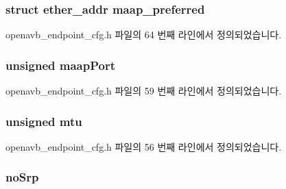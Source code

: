 \subsubsection[{\texorpdfstring{maap\+\_\+preferred}{maap_preferred}}]{\setlength{\rightskip}{0pt plus 5cm}struct ether\+\_\+addr maap\+\_\+preferred}\hypertarget{structopenavb__endpoint__cfg__t_aa373a13c1441edd60e02fe528e88b2e7}{}\label{structopenavb__endpoint__cfg__t_aa373a13c1441edd60e02fe528e88b2e7}


openavb\+\_\+endpoint\+\_\+cfg.\+h 파일의 64 번째 라인에서 정의되었습니다.

\subsubsection[{\texorpdfstring{maap\+Port}{maapPort}}]{\setlength{\rightskip}{0pt plus 5cm}unsigned maap\+Port}\hypertarget{structopenavb__endpoint__cfg__t_a5c3c54c1842b2ea86da2fb15728b5ab0}{}\label{structopenavb__endpoint__cfg__t_a5c3c54c1842b2ea86da2fb15728b5ab0}


openavb\+\_\+endpoint\+\_\+cfg.\+h 파일의 59 번째 라인에서 정의되었습니다.

\subsubsection[{\texorpdfstring{mtu}{mtu}}]{\setlength{\rightskip}{0pt plus 5cm}unsigned mtu}\hypertarget{structopenavb__endpoint__cfg__t_af9f36281e7abc3e1e6c467f8881cbfa2}{}\label{structopenavb__endpoint__cfg__t_af9f36281e7abc3e1e6c467f8881cbfa2}


openavb\+\_\+endpoint\+\_\+cfg.\+h 파일의 56 번째 라인에서 정의되었습니다.

\subsubsection[{\texorpdfstring{no\+Srp}{noSrp}}]{ no\+Srp}\hypertarget{structopenavb__endpoint__cfg__t_a7aa1ffc23600558afd81a0a6be1db5e6}{}\label{structopenavb__endpoint__cfg__t_a7aa1ffc23600558afd81a0a6be1db5e6}


